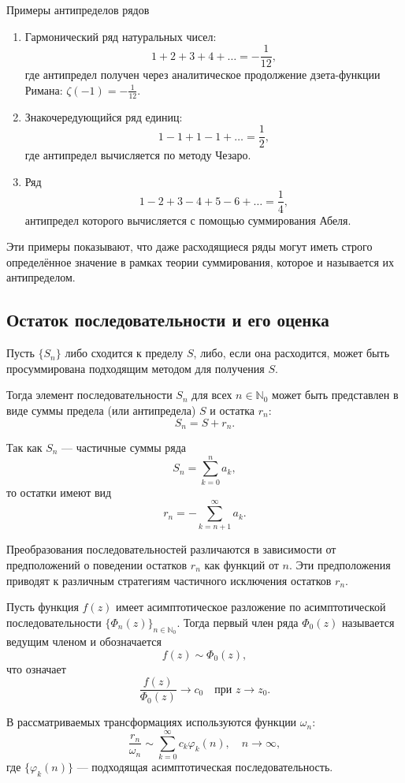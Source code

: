 \documentclass[14pt, a4paper]{extarticle}
\theoremstyle{definition}
\theoremstyle{remark}
\begin{document}
Примеры антипределов рядов
\begin{enumerate}
  \item Гармонический ряд натуральных чисел:
  \[
  1 + 2 + 3 + 4 + \dots = -\frac{1}{12},
  \]
  где антипредел получен через аналитическое продолжение дзета-функции Римана:  
  \(\zeta(-1) = -\frac{1}{12}\).

  \item Знакочередующийся ряд единиц:
  \[
  1 - 1 + 1 - 1 + \dots = \frac{1}{2},
  \]
  где антипредел вычисляется по методу Чезаро.

  \item Ряд
  \[
  1 - 2 + 3 - 4 + 5 - 6 + \dots = \frac{1}{4},
  \]
  антипредел которого вычисляется с помощью суммирования Абеля.
\end{enumerate}

Эти примеры показывают, что даже расходящиеся ряды могут иметь строго определённое значение в рамках теории суммирования, которое и называется их антипределом.



\subsection*{Остаток последовательности и его оценка}

Пусть \(\{S_n\}\) либо сходится к пределу \(S\), либо, если она расходится, может быть просуммирована подходящим методом для получения \(S\).

Тогда элемент последовательности \(S_n\) для всех \(n \in \mathbb{N}_0\) может быть представлен в виде суммы предела (или антипредела) \(S\) и остатка \(r_n\):
\[
S_n = S + r_n.
\]

Так как \(S_n\) — частичные суммы ряда
\[
S_n = \sum_{k=0}^{n} a_k,
\]
то остатки имеют вид
\[
r_n = - \sum_{k=n+1}^{\infty} a_k.
\]

Преобразования последовательностей различаются в зависимости от предположений о поведении остатков \(r_n\) как функций от \(n\). Эти предположения приводят к различным стратегиям частичного исключения остатков \(r_n\).

Пусть функция \(f(z)\) имеет асимптотическое разложение по асимптотической последовательности \(\{\Phi_n(z)\}_{n\in\mathbb{N}_0}\). Тогда первый член ряда \(\Phi_0(z)\) называется ведущим членом и обозначается
\[
f(z) \sim \Phi_0(z),
\]
что означает
\[
\frac{f(z)}{\Phi_0(z)} \to c_0 \quad \text{при } z \to z_0.
\]

В рассматриваемых трансформациях используются функции \(\omega_n\):
\[
\frac{r_n}{\omega_n} \sim \sum_{k=0}^{\infty} c_k \varphi_k(n), \quad n \to \infty,
\]
где \(\{\varphi_k(n)\}\) — подходящая асимптотическая последовательность.
\end{document}
